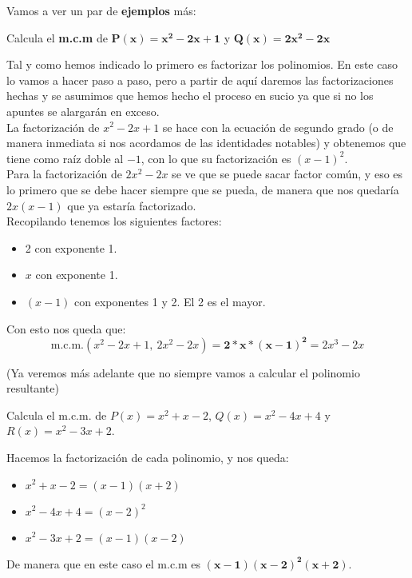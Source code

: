 \documentclass[a4paper,11pt,answers]{exam}
\begin{document}
Vamos a ver un par de \textbf{ejemplos} más:
\begin{questions}
\question Calcula el \textbf{m.c.m} de $\boldsymbol{P(x) = x^2 -2x +1} $ y
  $\boldsymbol{Q(x) = 2x^2 - 2x}$
  \begin{solution}
    Tal y como hemos indicado lo primero es factorizar los polinomios. En este caso lo
    vamos a hacer paso a paso, pero a partir de aquí daremos las factorizaciones hechas y se asumimos que hemos hecho el proceso en sucio ya que si no los apuntes se alargarán en exceso.\\
    
    La factorización de $x^2 -2x+ 1$ se hace con la ecuación de segundo grado (o de manera inmediata si nos acordamos de las identidades notables) y obtenemos que tiene como raíz doble al $-1$, con lo que su factorización es $(x-1)^2$.\\
    Para la factorización de $2x^2 -2x$ se ve que se puede sacar factor común, y eso es lo primero que se debe hacer siempre que se pueda, de manera que nos quedaría $2x(x-1)$ que ya estaría factorizado.\\

    Recopilando tenemos los siguientes factores:
    \begin{itemize}
    \item 2 con exponente 1.
    \item $x$ con exponente 1.
    \item $(x-1)$ con exponentes 1 y 2. El 2 es el mayor.
    \end{itemize}

    Con esto nos queda que:
    \[\text{m.c.m.}(x^2-2x+1,\ 2x^2-2x) = \boldsymbol{2*x*(x-1)^2} = 2x^3 - 2x\]
    \begin{small}
      (Ya veremos más adelante que no siempre vamos a calcular el polinomio resultante)
      \end{small}
  \end{solution}
\question Calcula el m.c.m. de $P(x) = x^2 +x-2$, $Q(x)=x^2 -4x + 4$ y $R(x) = x^2 -3x+2$.
  \begin{solution}
    Hacemos la factorización de cada polinomio, y nos queda:
    \begin{itemize}
    \item $x^2 +x -2 = (x-1)(x+2)$
    \item $x^2-4x+4 = (x-2)^2$
    \item $x^2-3x + 2= (x-1)(x-2)$
    \end{itemize}
    De manera que en este caso el m.c.m es $\boldsymbol{(x-1)(x-2)^2(x+2)}$.
  \end{solution}
\end{questions}
\end{document}
